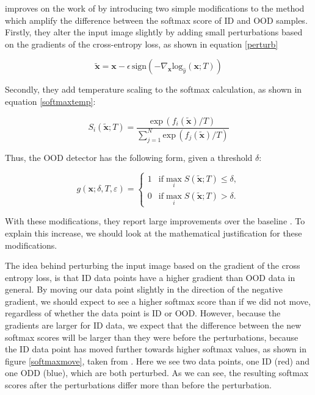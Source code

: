 \documentclass[conference]{IEEEtran}
\begin{document}
\cite{odin} improves on the work of \cite{oodbaseline} by introducing two simple modifications to the method which amplify the difference between the softmax score of ID and OOD samples. Firstly, they alter the input image slightly by adding small perturbations based on the gradients of the cross-entropy loss, as shown in equation \ref{perturb}

\begin{equation}
\tilde{\bm{x}} = \bm{x} - \epsilon \, \text{sign}(-\nabla_{\bm{x}} \text{log}_{\hat{y}}(\bm{x};T))
\label{perturb}
\end{equation}

Secondly, they add temperature scaling to the softmax calculation, as shown in equation \ref{softmaxtemp}:

\begin{equation}
S_i(\tilde{\bm{x}} ; T) = \frac{\text{exp} \, (f_i(\tilde{\bm{x}})/T)}{\sum^N_{j=1} \text{exp} \, (f_j(\tilde{\bm{x}})/T)}
\label{softmaxtemp}
\end{equation}

Thus, the OOD detector has the following form, given a threshold $\delta$:

\begin{equation}
g(\bm{x};\delta,T,\varepsilon)=\left\{\begin{matrix}1&\text{if} \max_{i}S(\tilde{\bm{x}};T)\le\delta,\\ 0&\text{if} \max_{i}S(\tilde{\bm{x}};T)>\delta. \end{matrix}\right.
\label{fullodin}
\end{equation}

With these modifications, they report large improvements over the baseline \cite[4]{odin}. To explain this increase, we should look at the mathematical justification for these modifications.

The idea behind perturbing the input image based on the gradient of the cross entropy loss, is that ID data points have a higher gradient than OOD data in general. By moving our data point slightly in the direction of the negative gradient, we should expect to see a higher softmax score than if we did not move, regardless of whether the data point is ID or OOD. However, because the gradients are larger for ID data, we expect that the difference between the new softmax scores will be larger than they were before the perturbations, because the ID data point has moved further towards higher softmax values, as shown in figure \ref{softmaxmove}, taken from \cite[8]{odin}. Here we see two data points, one ID (red) and one ODD (blue), which are both perturbed. As we can see, the resulting softmax scores after the perturbations differ more than before the perturbation.
\end{document}
